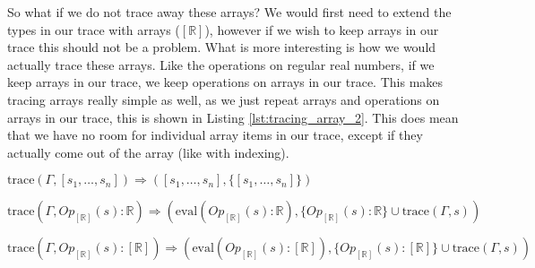         So what if we do not trace away these arrays?
        We would first need to extend the types in our trace with arrays ($[\mathbb{R}]$), however if we wish to keep arrays in our trace this should not be a problem.
        What is more interesting is how we would actually trace these arrays.
        Like the operations on regular real numbers, if we keep arrays in our trace, we keep operations on arrays in our trace.
        This makes tracing arrays really simple as well, as we just repeat arrays and operations on arrays in our trace, this is shown in Listing \ref{lst:tracing_array_2}.
        This does mean that we have no room for individual array items in our trace, except if they actually come out of the array (like with indexing).

        \begin{quicklst}[caption=Keeping arrays in traces, label=lst:tracing_array_2, gobble=12]
            $\text{trace}(\Gamma,[s_1,\dots,s_n])\Rightarrow([s_1,\dots,s_n],\{[s_1,\dots,s_n]\})$

            $\text{trace}(\Gamma,Op_{[\mathbb{R}]}(s):\mathbb{R})\Rightarrow(\text{eval}(Op_{[\mathbb{R}]}(s):\mathbb{R}),\{Op_{[\mathbb{R}]}(s):\mathbb{R}\}\cup\text{trace}(\Gamma,s))$

            $\text{trace}(\Gamma,Op_{[\mathbb{R}]}(s):[\mathbb{R}])\Rightarrow(\text{eval}(Op_{[\mathbb{R}]}(s):[\mathbb{R}]),\{Op_{[\mathbb{R}]}(s):[\mathbb{R}]\}\cup\text{trace}(\Gamma,s))$
        \end{quicklst}